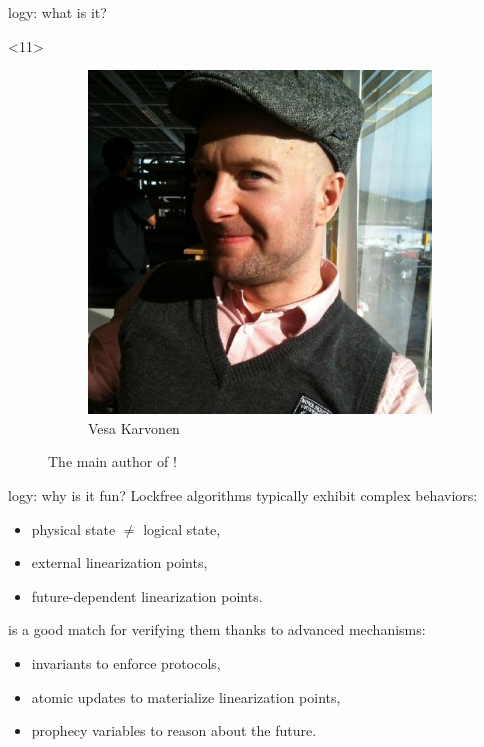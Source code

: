 \begin{frame}[fragile]{\Zoo[]logy: what is it?}
\begin{adjustwidth}{-1em}{-1em}
\begin{overbox}<11>
    \begin{figure}
        \begin{subfigure}{0.4\textwidth}
            \includegraphics[scale=0.2]{images/vesa_karvonen.jpg}
            \caption*{\footnotesize Vesa Karvonen}
        \end{subfigure}
        \caption*{The main author of \Kcas!}
    \end{figure}
\end{overbox}


\end{adjustwidth}

\end{frame}


\begin{frame}{\Zoo[]logy: why is it fun?}
Lockfree algorithms typically exhibit complex behaviors:
\begin{itemize}
    \item physical state $\neq$ logical state,
    \item external linearization points,
    \item future-dependent linearization points.
\end{itemize}
\vfill
\Iris is a good match for verifying them thanks to advanced mechanisms:
\begin{itemize}
    \item invariants to enforce protocols,
    \item atomic updates to materialize linearization points,
    \item prophecy variables to reason about the future.
\end{itemize}
\end{frame}